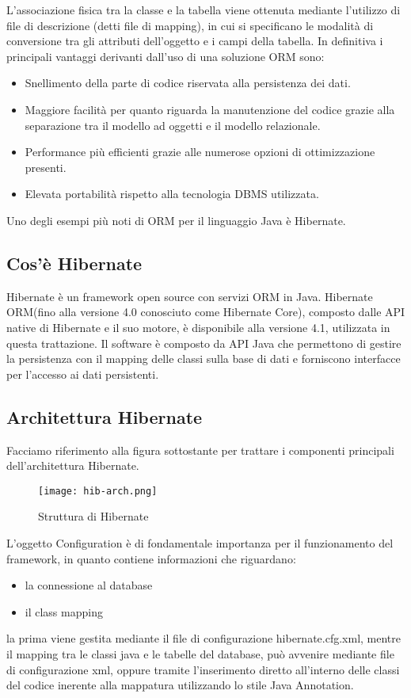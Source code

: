 L'associazione fisica tra la classe e la tabella viene ottenuta mediante l'utilizzo di file di descrizione (detti file di mapping), in cui si specificano le modalit\`a di conversione tra gli attributi dell'oggetto e i campi della tabella. In definitiva i principali vantaggi derivanti dall'uso di una soluzione ORM sono:

\begin{itemize}
\item Snellimento della parte di codice riservata alla persistenza dei dati.
\item Maggiore facilit\`a per quanto riguarda la manutenzione del codice grazie alla separazione tra il modello ad oggetti e il modello relazionale.
\item Performance pi\`u efficienti grazie alle numerose opzioni di ottimizzazione presenti.
\item Elevata portabilit\`a rispetto alla tecnologia DBMS utilizzata.
\end{itemize}

Uno degli esempi pi\`u noti di ORM per il linguaggio Java \`e Hibernate.
\subsection{Cos'\`e Hibernate}
Hibernate \`e un framework open source
con servizi ORM in Java. Hibernate ORM(fino alla versione 4.0 conosciuto come Hibernate Core), composto dalle API native di Hibernate e il suo motore, \`e disponibile alla versione 4.1, utilizzata in questa trattazione.
Il software \`e composto da API Java che permettono di gestire la persistenza con il mapping delle classi sulla base di dati e forniscono interfacce per l'accesso ai dati persistenti.
\subsection{Architettura Hibernate}
Facciamo riferimento alla figura sottostante per  trattare i componenti principali dell'architettura Hibernate.

\FloatBarrier
\begin{figure}[H]
\centering%
\texttt{[image: hib-arch.png]}%
\caption{Struttura di Hibernate}\label{fig:hibernate}%
\end{figure}

L'oggetto Configuration \`e di fondamentale importanza per il funzionamento del framework, in quanto contiene informazioni che riguardano:
\begin{itemize}
\item la connessione al database
\item il class mapping
\end{itemize}
la prima viene gestita mediante il file di configurazione hibernate.cfg.xml, mentre il mapping tra le classi java e le tabelle del database, pu\`o avvenire mediante file di configurazione xml, oppure tramite l'inserimento diretto all'interno delle classi del codice inerente alla mappatura utilizzando lo stile Java Annotation.

